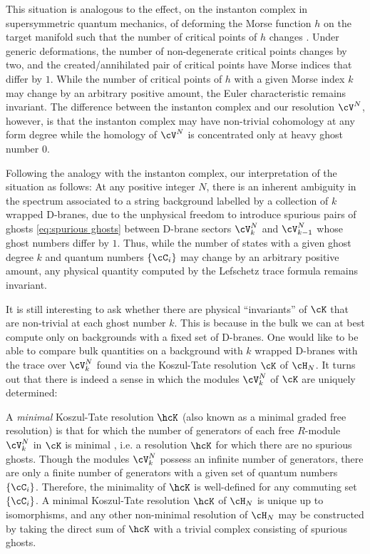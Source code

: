 \documentclass[a4paper,12pt]{article}
\begin{document}
This situation is analogous to the effect, on the instanton complex in supersymmetric quantum mechanics, of deforming the Morse function $h$ on the target manifold such that the number of critical points of $h$ changes \cite{Witten:1982im}. Under generic deformations, the number of non-degenerate critical points changes by two, and the created/annihilated pair of critical points have Morse indices that differ by $1$. While the number of critical points of $h$ with a given Morse index $k$ may change by an arbitrary positive amount, the Euler characteristic remains invariant. The difference between the instanton complex and our resolution $\cV^N$, however, is that the instanton complex may have non-trivial cohomology at any form degree while the homology of $\cV^N$ is concentrated only at heavy ghost number $0$.

Following the analogy with the instanton complex, our interpretation of the situation as follows: At any positive integer $N$, there is an inherent ambiguity in the spectrum associated to a string background labelled by a collection of $k$ wrapped D-branes, due to the unphysical freedom to introduce spurious pairs of ghosts \eqref{eq:spurious ghosts} between D-brane sectors $\cV_k^{N}$ and $\cV_{k-1}^{N}$ whose ghost numbers differ by $1$. Thus, while the number of states with a given ghost degree $k$ and quantum numbers $\{ \cC_i \}$ may change by an arbitrary positive amount, any physical quantity computed by the Lefschetz trace formula remains invariant. 

It is still interesting to ask whether there are physical ``invariants'' of $\cK$ that are non-trivial at each ghost number $k$. This is because in the bulk we can at best compute only on backgrounds with a fixed set of D-branes. One would like to be able to compare bulk quantities on a background with $k$ wrapped D-branes with the trace over $\cV_k^{N}$ found via the Koszul-Tate resolution $\cK$ of $\cH_N$. It turns out that there is indeed a sense in which the modules $\cV_k^N$ of $\cK$ are uniquely determined:

A \textit{minimal} Koszul-Tate resolution $\hcK$ (also known as a minimal graded free resolution) is that for which the number of generators of each free $R$-module $\cV_k^N$ in $\cK$ is minimal \cite{Eisenbud:1995}, i.e. a resolution $\hcK$ for which there are no spurious ghosts. Though the modules $\cV_k^N$ possess an infinite number of generators, there are only a finite number of generators with a given set of quantum numbers $\{ \cC_i \}$. Therefore, the minimality of $\hcK$ is well-defined for any commuting set $\{ \cC_i \}$. A minimal Koszul-Tate resolution $\hcK$ of $\cH_N$ is unique up to isomorphisms, and any other non-minimal resolution of $\cH_N$ may be constructed by taking the direct sum of $\hcK$ with a trivial complex consisting of spurious ghosts.
\end{document}
